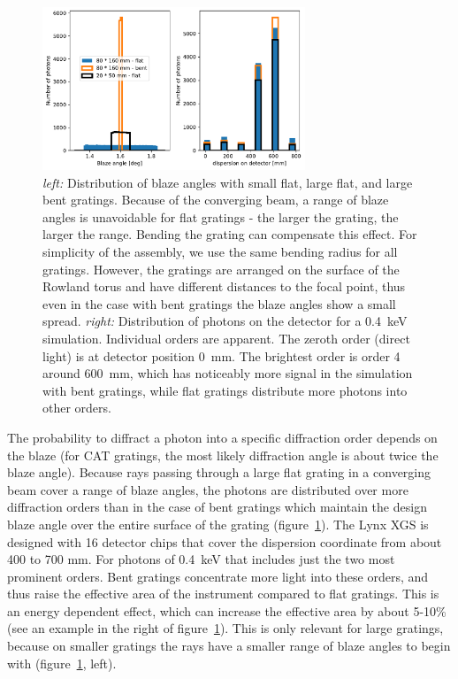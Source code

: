 \documentclass[]{spie}  %
\begin{document}
\begin{figure} [ht]
\begin{center}
\includegraphics[width=0.7\textwidth]{blazebend}
\end{center}
\caption {\label{fig:blazebend}
\emph{left:} Distribution of blaze angles with small flat, large flat, and large bent gratings. Because of the converging beam, a range of blaze angles is unavoidable for flat gratings - the larger the grating, the larger the range. Bending the grating can compensate this effect. For simplicity of the assembly, we use the same bending radius for all gratings. However, the gratings are arranged on the surface of the Rowland torus and have different distances to the focal point, thus even in the case with bent gratings the blaze angles show a small spread.
\emph{right:} Distribution of photons on the detector for a 0.4~keV simulation. Individual orders are apparent. The zeroth order (direct light) is at detector position 0~mm. The brightest order is order 4 around 600~mm, which has noticeably more signal in the simulation with bent gratings, while flat gratings distribute more photons into other orders.
}
\end{figure}


The probability to diffract a photon into a specific diffraction order depends on the blaze (for CAT gratings, the most likely diffraction angle is about twice the blaze angle). Because rays passing through a large flat grating in a converging beam cover a range of blaze angles, the photons are distributed over more diffraction orders than in the case of bent gratings which maintain the design blaze angle over the entire surface of the grating (figure~\ref{fig:blazebend}). The Lynx XGS is designed with 16 detector chips that cover the dispersion coordinate from about 400 to 700 mm. For photons of 0.4~keV that includes just the two most prominent orders. Bent gratings concentrate more light into these orders, and thus raise the effective area of the instrument compared to flat gratings. This is an energy dependent effect, which can increase the effective area by about 5-10\% (see an example in the right of figure~\ref{fig:blazebend}). This is only relevant for large gratings, because on smaller gratings the rays have a smaller range of blaze angles to begin with (figure~\ref{fig:blazebend}, left).
\end{document}
